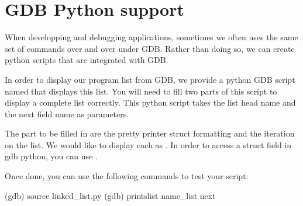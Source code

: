 \section{GDB Python support}

When developping and debugging applications, sometimes we often uses the same
set of commands over and over under GDB. Rather than doing so, we can create 
python scripts that are integrated with GDB.

In order to display our program list from GDB, we provide a python GDB script
named  that displays this list. You will need to fill two
parts of this script to display a complete list correctly. This python script
takes the list head name and the next field name as parameters.

The part to be filled in are the pretty printer struct formatting and the
iteration on the list. We would like to display each  as
. In order to access a struct field in gdb python, you can use
.

Once done, you can use the following commands to test your script:

\begin{bashinput}
(gdb) source linked_list.py
(gdb) printslist name_list next
\end{bashinput}
